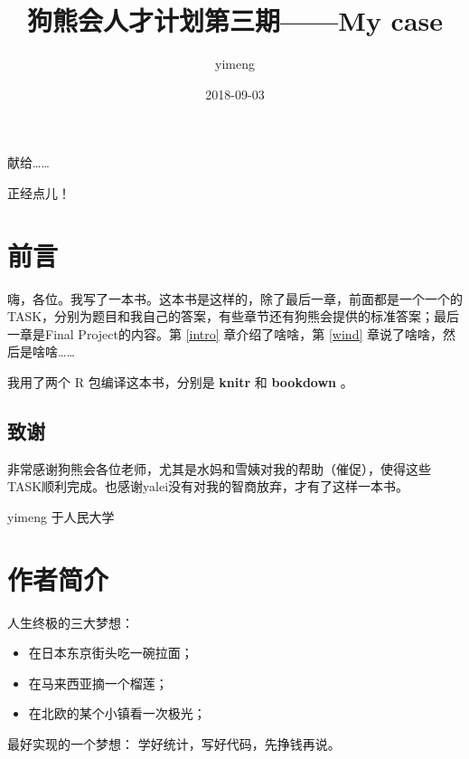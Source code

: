 \documentclass[]{ctexbook}
\title{狗熊会人才计划第三期------My case}
\author{yimeng}
\date{2018-09-03}
\providecommand{\tightlist}{%
  \setlength{\itemsep}{0pt}\setlength{\parskip}{0pt}}
\let\BeginKnitrBlock\begin \let\EndKnitrBlock\end
\begin{document}
\maketitle


\thispagestyle{empty}

\begin{center}
献给……

正经点儿！
\end{center}

\setlength{\abovedisplayskip}{-5pt}
\setlength{\abovedisplayshortskip}{-5pt}

{
\setcounter{tocdepth}{2}
\tableofcontents
}
\listoftables
\listoffigures
\chapter*{前言}


嗨，各位。我写了一本书。这本书是这样的，除了最后一章，前面都是一个一个的TASK，分别为题目和我自己的答案，有些章节还有狗熊会提供的标准答案；最后一章是Final
Project的内容。第 \ref{intro} 章介绍了啥啥，第 \ref{wind}
章说了啥啥，然后是啥啥\ldots{}\ldots{}

我用了两个 R 包编译这本书，分别是 \textbf{knitr}
\citep{xie2015} 和 \textbf{bookdown}
\citep{R-bookdown}。

\section*{致谢}


非常感谢狗熊会各位老师，尤其是水妈和雪姨对我的帮助（催促），使得这些TASK顺利完成。也感谢yalei没有对我的智商放弃，才有了这样一本书。

\BeginKnitrBlock{flushright}
yimeng 于人民大学
\EndKnitrBlock{flushright}

\chapter*{作者简介}\label{author}


人生终极的三大梦想：

\begin{itemize}
\tightlist
\item
  在日本东京街头吃一碗拉面；
\item
  在马来西亚摘一个榴莲；
\item
  在北欧的某个小镇看一次极光；
\end{itemize}

最好实现的一个梦想： 学好统计，写好代码，先挣钱再说。
\end{document}
